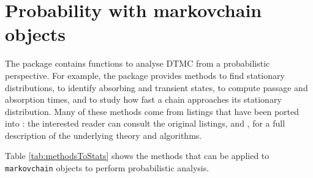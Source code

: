 \documentclass[
  nojss]{jss}
\begin{document}
\section{Probability with markovchain objects}\label{sec:probability}

The  package contains functions to analyse DTMC from a probabilistic perspective. For example, the package provides methods to find stationary distributions, to identify absorbing and transient states, to compute passage and absorption times, and to study how fast a chain approaches its stationary distribution. Many of these methods come from  listings that have been ported into : the interested reader can consult the original listings, \cite{renaldoMatlab} and \cite{montgomery}, for a full description of the underlying theory and algorithms.

Table \ref{tab:methodsToStats} shows the methods that can be applied to \texttt{markovchain} objects to perform probabilistic analysis.
\end{document}
